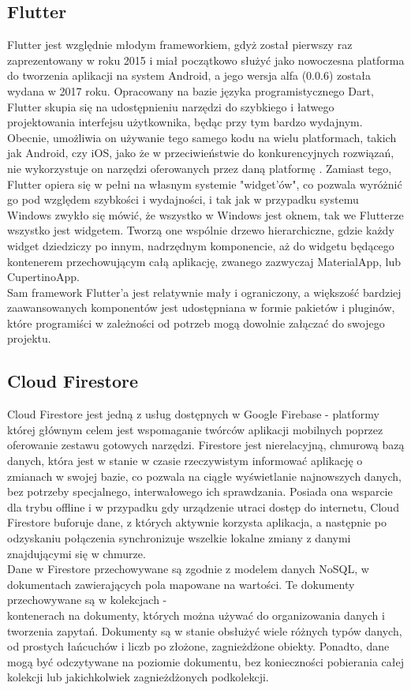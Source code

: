 \documentclass[12pt, a4paper]{article}
\begin{document}
\begin{sloppypar}
{  \subsection{Flutter}
  {
    Flutter jest względnie młodym frameworkiem, gdyż został pierwszy raz zaprezentowany
    w roku 2015 i miał początkowo służyć jako nowoczesna platforma do tworzenia aplikacji
    na system Android, a jego wersja alfa (0.0.6) została wydana w 2017 roku.
    Opracowany na bazie języka programistycznego Dart, Flutter skupia się
    na udostępnieniu narzędzi do szybkiego i łatwego projektowania interfejsu użytkownika,
    będąc przy tym bardzo wydajnym. Obecnie, umożliwia on używanie tego samego kodu na
    wielu platformach, takich jak Android, czy iOS, jako że w przeciwieństwie do
    konkurencyjnych rozwiązań, nie wykorzystuje on narzędzi oferowanych przez daną
    platformę \cite{flutter}. Zamiast tego, Flutter opiera się w pełni na własnym
    systemie "widget'ów", co pozwala wyróżnić go pod względem szybkości i wydajności,
    i tak jak w przypadku systemu Windows zwykło się mówić, że wszystko w Windows jest
    oknem, tak we Flutterze wszystko jest widgetem. Tworzą one wspólnie drzewo hierarchiczne,
    gdzie każdy widget dziedziczy po innym, nadrzędnym komponencie, aż do widgetu będącego
    kontenerem przechowującym całą aplikację, zwanego zazwyczaj MaterialApp, lub
    CupertinoApp.\\
    Sam framework Flutter'a jest relatywnie mały i ograniczony, a większość bardziej
    zaawansowanych komponentów jest udostępniana w formie pakietów i pluginów, które
    programiści w zależności od potrzeb mogą dowolnie załączać do swojego projektu.
  }
  \subsection{Cloud Firestore}
  {
    Cloud Firestore jest jedną z usług dostępnych w Google Firebase - platformy której
    głównym celem jest wspomaganie twórców aplikacji mobilnych poprzez oferowanie
    zestawu gotowych narzędzi. Firestore jest nierelacyjną, chmurową bazą danych, która
    jest w stanie w czasie rzeczywistym informować aplikację o zmianach w swojej bazie,
    co pozwala na ciągłe wyświetlanie najnowszych danych, bez potrzeby specjalnego,
    interwałowego ich sprawdzania. Posiada ona wsparcie dla trybu offline i w przypadku
    gdy urządzenie utraci dostęp do internetu, Cloud Firestore buforuje dane, z których
    aktywnie korzysta aplikacja, a następnie po odzyskaniu połączenia synchronizuje
    wszelkie lokalne zmiany z danymi znajdującymi się w chmurze.\\
    Dane w Firestore przechowywane są zgodnie z modelem danych NoSQL, w dokumentach
    zawierających pola mapowane na wartości. Te dokumenty przechowywane są w kolekcjach - \\
    kontenerach na dokumenty, których można używać do organizowania danych i tworzenia
    zapytań. Dokumenty są w stanie obsłużyć wiele różnych typów danych, od prostych
    łańcuchów i liczb po złożone, zagnieżdżone obiekty. Ponadto, dane mogą być odczytywane
    na poziomie dokumentu, bez konieczności pobierania całej kolekcji lub jakichkolwiek
    zagnieżdżonych podkolekcji.
  }
}
\end{sloppypar}
\end{document}
